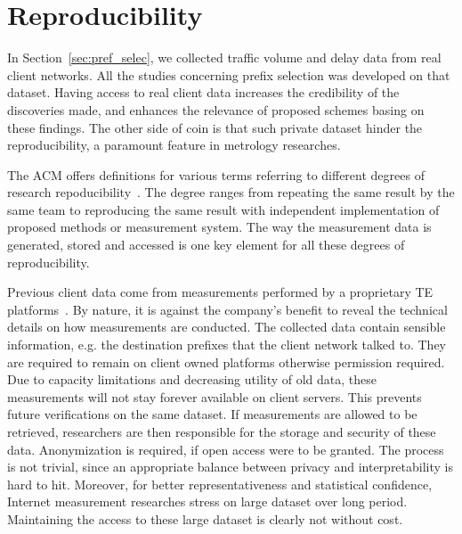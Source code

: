 \section{Reproducibility}
In Section~\ref{sec:pref_selec}, we collected traffic volume and delay data from real client networks. All the studies concerning prefix selection was developed on that dataset.
Having access to real client data increases the credibility of the discoveries made, and enhances the relevance of proposed schemes basing on these findings.
The other side of coin is that such private dataset hinder the reproducibility, a paramount feature in metrology researches.

The \acf{ACM} offers definitions for various terms referring to different degrees of research repoducibility~\cite{acm}.
The degree ranges from repeating the same result by the same team to reproducing the same result with independent implementation of proposed methods or measurement system.
The way the measurement data is generated, stored and accessed is one key element for all these degrees of reproducibility.

Previous client data come from measurements performed by a proprietary TE platforms~\cite{b6}.
By nature, it is against the company's benefit to reveal the technical details on how measurements are conducted. 
The collected data contain sensible information, e.g. the destination prefixes that the client network talked to.
They are required to remain on client owned platforms otherwise permission required. 
Due to capacity limitations and decreasing utility of old data, these measurements will not stay forever available on client servers. 
This prevents future verifications on the same dataset.
If measurements are allowed to be retrieved, researchers are then responsible for the storage and security of these data. 
Anonymization is required, if open access were to be granted. 
The process is not trivial, since an appropriate balance between privacy and interpretability is hard to hit. 
Moreover, for better representativeness and statistical confidence, Internet measurement researches stress on large dataset over long period. 
Maintaining the access to these large dataset is clearly not without cost. 

